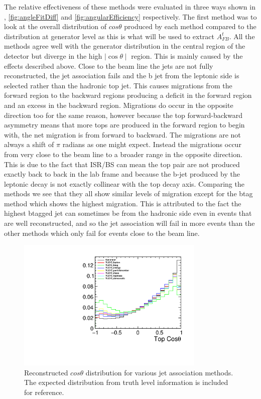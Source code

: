 The relative effectiveness of these methods were evaluated in three ways shown in , \ref{fig:angleFitDiff} and \ref{fig:angularEfficiency} respectively. The first method was to look at the overall distribution of $cos\theta$ produced by each method compared to the distribution at generator level as this is what will be used to extract $A_{FB}^{t}$. All the methods agree well with the generator distribution in the central region of the detector but diverge in the high $\mid\cos\theta\mid$ region. This is mainly caused by the effects described above. Close to the beam line the jets are not fully reconstructed, the jet association fails and the b jet from the leptonic side is selected rather than the hadronic top jet. This causes migrations from the forward region to the backward regions producing a deficit in the forward region and an excess in the backward region. Migrations do occur in the opposite direction too for the same reason, however because the top forward-backward asymmetry means that more tops are produced in the forward region to begin with, the net migration is from forward to backward. The migrations are not always a shift of $\pi$ radians as one might expect. Instead the migrations occur from very close to the beam line to a broader range in the opposite direction. This is due to the fact that \ac{ISR}/\ac{BS} can mean the top pair are not produced exactly back to back in the lab frame and because the b-jet produced by the leptonic decay is not exactly collinear with the top decay axis. Comparing the methods we see that they all show similar levels of migration except for the btag method which shows the highest migration. This is attributed to the fact the highest btagged jet can sometimes be from the hadronic side even in events that are well reconstructed, and so the jet association will fail in more events than the other methods which only fail for events close to the beam line.

\begin{figure}
  \centering
  \includegraphics[width=0.8\textwidth]{TopAnalysis/figures/comparejetmethods.pdf}
  \caption[Reconstructed $cos\theta$ distribution for various jet association methods]{Reconstructed $cos\theta$ distribution for various jet association methods. The expected distribution from truth level information is included for reference.}
  \label{fig:methodComparison}
\end{figure}

